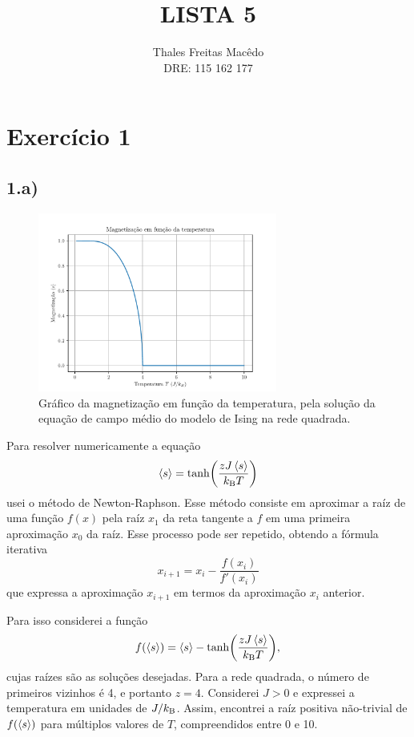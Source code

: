 \documentclass[a4paper, brazil]{article}
\author{Thales Freitas Macêdo \\ DRE: 115 162 177}
\title{LISTA 5}
\begin{document}
\maketitle

\section{Exercício 1}

\subsection*{1.a)}

    \begin{figure}[ht]
        \centering
        \includegraphics[width=0.7\textwidth]{fig_1a.pdf}
        \caption{Gráfico da magnetização em função da temperatura, pela solução da equação de campo médio do modelo de Ising na rede quadrada.}\label{fig1a}
    \end{figure}

    Para resolver numericamente a equação
    \begin{equation}
        \expval{s} = \tanh( \frac{z J \expval{s}}{k_\text{B} T} )
    \end{equation}
    usei o método de Newton-Raphson.
    Esse método consiste em aproximar a raíz de uma função \( f(x) \) pela raíz \( x_1 \) da reta tangente a \( f \) em uma primeira aproximação \( x_0 \) da raíz.
    Esse processo pode ser repetido, obtendo a fórmula iterativa
    \begin{equation}
        x_{i + 1} = x_{i} - \frac{f(x_i)}{f'(x_i)}
    \end{equation}
    que expressa a aproximação \( x_{i + 1} \) em termos da aproximação \( x_i \) anterior.

    Para isso considerei a função
    \begin{equation}
        f(\expval{s}) = \expval{s} - \tanh( \frac{z J \expval{s}}{k_\text{B} T} ) ,
    \end{equation}
    cujas raízes são as soluções desejadas.
    Para a rede quadrada, o número de primeiros vizinhos é 4, e portanto \( z = 4 \).
    Considerei \( J > 0 \) e expressei a temperatura em unidades de \( J / k_\text{B} \).
    Assim, encontrei a raíz positiva não-trivial de \( f (\expval{s}) \) para múltiplos valores de \( T \), compreendidos entre 0 e 10.
\end{document}
